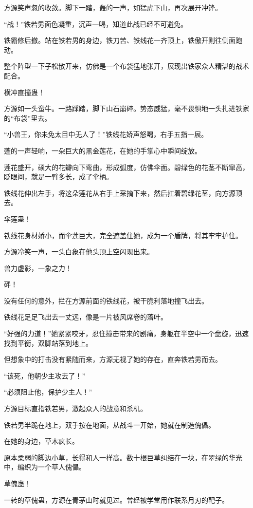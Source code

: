 \begin{this_body}
方源笑声忽的收敛。脚下一踏，轰的一声，如猛虎下山，再次展开冲锋。

“战！”铁若男面色凝重，沉声一喝，知道此战已经不可避免。

铁霸修后撤。站在铁若男的身边，铁刀苦、铁线花一齐顶上，铁傲开则往侧面跑动。

整个阵型一下子松散开来，仿佛是一个布袋猛地张开，展现出铁家众人精湛的战术配合。

横冲直撞蛊！

方源如一头蛮牛。一路踩踏，脚下山石崩碎。势态威猛，毫不畏惧地一头扎进铁家的“布袋”里去。

“小兽王，你未免太目中无人了！”铁线花娇声怒喝，右手五指一展。

蓬的一声轻响，一朵巨大的黑金莲花，在她的手掌心中瞬间绽放。

莲花盛开，硕大的花瓣向下弯曲，形成弧度，仿佛伞面。碧绿色的花茎不断窜高，眨眼间，就是一臂多长，成了伞柄。

铁线花伸出左手，将这朵莲花从右手上采摘下来，然后扛着碧绿花茎，向方源顶去。

伞莲蛊！

铁线花身材娇小，而伞莲巨大，完全遮盖住她，成为一个盾牌，将其牢牢护住。

方源冷笑一声，一头白象在他头顶上空闪现出来。

兽力虚影，一象之力！

砰！

没有任何的意外，拦在方源前面的铁线花，被干脆利落地撞飞出去。

铁线花足足飞出去一丈远，像是一片被风席卷的落叶。

“好强的力道！”她紧紧咬牙，忍住撞击带来的剧痛，身躯在半空中一个盘旋，迅速找到平衡，双脚站落到地上。

但想象中的打击没有紧随而来，方源无视了她的存在，直奔铁若男而去。

“该死，他朝少主攻去了！”

“必须阻止他，保护少主人！”

方源目标直指铁若男，激起众人的战意和杀机。

铁若男半跪在地上，双手按在地面，从战斗一开始，她就在制造傀儡。

在她的身边，草木疯长。

原本柔弱的脚边小草，长得和人一样高。数十根巨草纠结在一块，在翠绿的华光中，编织为一个草人傀儡。

草傀蛊！

一转的草傀蛊，方源在青茅山时就见过。曾经被学堂用作联系月刃的靶子。


\end{this_body}
